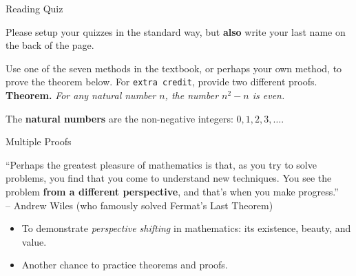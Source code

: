 \documentclass[10pt]{beamer}
\begin{document}
\begin{frame}{Reading Quiz}

\begin{myyellowbox}[title=Logistics Alert]
Please setup your quizzes in the standard way, but \textbf{also} write your last name on the back of the page. 
\end{myyellowbox}
\vfill
 \begin{mygreenbox}[title=Reading Quiz (Multiple Proofs - Hampkins CH 2)]
Use one of the seven methods in the textbook, or perhaps your own method, to prove the theorem below.  For \texttt{extra credit}, provide two different proofs. \\

\textbf{Theorem.} \textit{For any natural number $n$, the number $n^2-n$ is even.}
\end{mygreenbox}
\vfill 

\begin{myredbox}[title=Definition]
The \textbf{natural numbers} are the non-negative integers: $0,1,2,3, \hdots$.
\end{myredbox}


\end{frame}






\begin{frame}{Multiple Proofs}

\begin{mygreenbox}[title=Quote of the Day]
“Perhaps the greatest pleasure of mathematics is that, as you try to solve problems, you find that you come to understand new techniques. You see the problem \textbf{from a different perspective}, and that’s when you make progress.”  \\

-- Andrew Wiles (who famously solved Fermat's Last Theorem)
\end{mygreenbox}
	
\vfill \vfill 
\begin{myredbox}[title=Role of this chapter]
\begin{itemize}
\item To demonstrate \textit{perspective shifting} in mathematics: its existence, beauty, and value.
\item Another chance to practice theorems and proofs.	
\end{itemize}

	
\end{myredbox}

\end{frame}
\end{document}
